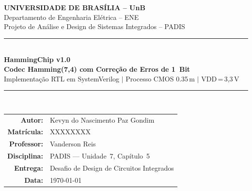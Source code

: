 \documentclass[12pt,a4paper]{article}
\begin{document}
\thispagestyle{empty}

\begin{center}
  \vspace*{1.2cm}
  {\small\textbf{UNIVERSIDADE DE BRASÍLIA -- UnB}}\\[2pt]
  {\small Departamento de Engenharia Elétrica -- ENE}\\[2pt]
  {\small Projeto de Análise e Design de Sistemas Integrados -- PADIS}\\[30pt]

  \textcolor{hammingblue}{\rule{14cm}{1.5pt}}\\[12pt]

  {\LARGE\bfseries\color{hammingblue} HammingChip v1.0}\\[8pt]
  {\large\bfseries\color{hammingteal} Codec Hamming(7,4) com Correção de Erros de 1~Bit}\\[8pt]
  {\normalsize\color{hamminggray}
    Implementação RTL em SystemVerilog $|$ Processo CMOS 0.35\,\textmu m $|$ VDD\,=\,3,3\,V}\\[12pt]

  \textcolor{hammingblue}{\rule{14cm}{1.5pt}}\\[24pt]

  \begin{tabular}{rl}
    \textbf{Autor:}       & Kevyn do Nascimento Paz Gondim \\
    \textbf{Matrícula:}   & XXXXXXXX \\
    \textbf{Professor:}   & Vanderson Reis \\
    \textbf{Disciplina:}  & PADIS --- Unidade~7, Capítulo~5 \\
    \textbf{Entrega:}     & Desafio de Design de Circuitos Integrados \\
    \textbf{Data:}        & \today \\
  \end{tabular}\\[24pt]

\end{center}
\end{document}

